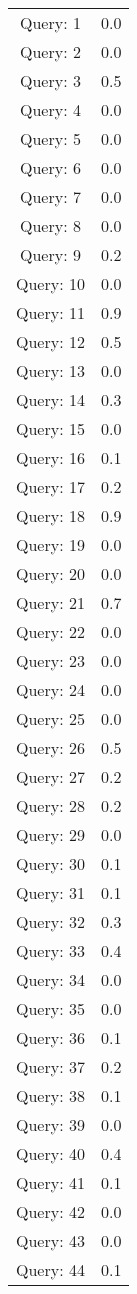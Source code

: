 
\begin{table}[hbtp]
\centering
\begin{tabular}{cc}
Query: 1&0.0
\\
Query: 2&0.0
\\
Query: 3&0.5
\\
Query: 4&0.0
\\
Query: 5&0.0
\\
Query: 6&0.0
\\
Query: 7&0.0
\\
Query: 8&0.0
\\
Query: 9&0.2
\\
Query: 10&0.0
\\
Query: 11&0.9
\\
Query: 12&0.5
\\
Query: 13&0.0
\\
Query: 14&0.3
\\
Query: 15&0.0
\\
Query: 16&0.1
\\
Query: 17&0.2
\\
Query: 18&0.9
\\
Query: 19&0.0
\\
Query: 20&0.0
\\
Query: 21&0.7
\\
Query: 22&0.0
\\
Query: 23&0.0
\\
Query: 24&0.0
\\
Query: 25&0.0
\\
Query: 26&0.5
\\
Query: 27&0.2
\\
Query: 28&0.2
\\
Query: 29&0.0
\\
Query: 30&0.1
\\
Query: 31&0.1
\\
Query: 32&0.3
\\
Query: 33&0.4
\\
Query: 34&0.0
\\
Query: 35&0.0
\\
Query: 36&0.1
\\
Query: 37&0.2
\\
Query: 38&0.1
\\
Query: 39&0.0
\\
Query: 40&0.4
\\
Query: 41&0.1
\\
Query: 42&0.0
\\
Query: 43&0.0
\\
Query: 44&0.1
\\

\end{tabular}
\end{table}
